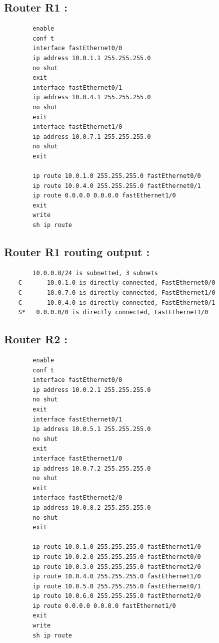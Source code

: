 \documentclass[a4paper,11pt]{article}
\begin{document}
	 	\subsection{Router R1 :}
	 	\label{subsec:routerconf1}
	 	\begin{lstlisting}
	 	enable
	 	conf t
	 	interface fastEthernet0/0
	 	ip address 10.0.1.1 255.255.255.0
	 	no shut
	 	exit
	 	interface fastEthernet0/1
	 	ip address 10.0.4.1 255.255.255.0
	 	no shut
	 	exit
	 	interface fastEthernet1/0
	 	ip address 10.0.7.1 255.255.255.0
	 	no shut
	 	exit

	 	ip route 10.0.1.0 255.255.255.0 fastEthernet0/0
	 	ip route 10.0.4.0 255.255.255.0 fastEthernet0/1
	 	ip route 0.0.0.0 0.0.0.0 fastEthernet1/0
	 	exit
	 	write
	 	sh ip route
	 	\end{lstlisting}

	 	\subsection{Router R1 routing output :}
	 	\label{subsec:routerconfout1}
	 	\begin{lstlisting}
	 	10.0.0.0/24 is subnetted, 3 subnets
	C       10.0.1.0 is directly connected, FastEthernet0/0
	C       10.0.7.0 is directly connected, FastEthernet1/0
	C       10.0.4.0 is directly connected, FastEthernet0/1
	S*   0.0.0.0/0 is directly connected, FastEthernet1/0
	 	\end{lstlisting}

	 	\subsection{Router R2 :}
	 	\label{subsec:routerconf2}
	 	\begin{lstlisting}
	 	enable
	 	conf t
	 	interface fastEthernet0/0
	 	ip address 10.0.2.1 255.255.255.0
	 	no shut
	 	exit
	 	interface fastEthernet0/1
	 	ip address 10.0.5.1 255.255.255.0
	 	no shut
	 	exit
	 	interface fastEthernet1/0
	 	ip address 10.0.7.2 255.255.255.0
	 	no shut
	 	exit
	 	interface fastEthernet2/0
	 	ip address 10.0.8.2 255.255.255.0
	 	no shut
	 	exit

	 	ip route 10.0.1.0 255.255.255.0 fastEthernet1/0
	 	ip route 10.0.2.0 255.255.255.0 fastEthernet0/0
	 	ip route 10.0.3.0 255.255.255.0 fastEthernet2/0
	 	ip route 10.0.4.0 255.255.255.0 fastEthernet1/0
	 	ip route 10.0.5.0 255.255.255.0 fastEthernet0/1
	 	ip route 10.0.6.0 255.255.255.0 fastEthernet2/0
	 	ip route 0.0.0.0 0.0.0.0 fastEthernet1/0
	 	exit
	 	write
	 	sh ip route
	 	\end{lstlisting}
\end{document}
